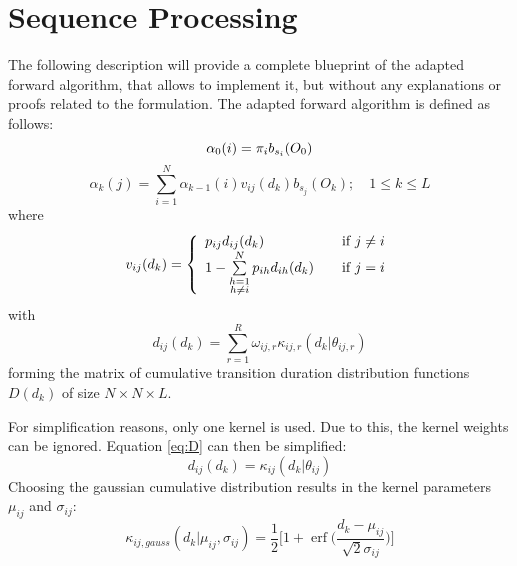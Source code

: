 \documentclass[mscthesis]{usiinfthesis}
\DeclareMathOperator{\erf}{erf}
\begin{document}
\section{Sequence Processing}

The following description will provide a complete blueprint of the adapted
forward algorithm, that allows to implement it, but without any explanations or
proofs related to the formulation. The adapted forward algorithm is defined as
follows:
\begin{equation}
    \label{eq:forward_init}
    \alpha_0(i) = \pi_{i}b_{s_i}(O_0) \\
\end{equation}
\begin{equation}
    \label{eq:forward}
    \alpha_k(j) = \sum_{i=1}^{N} \alpha_{k-1}(i) v_{ij}(d_k) b_{s_j}(O_k);
    \quad 1 \leq k \leq L
\end{equation}
where
\begin{equation}
    \label{eq:V}
    v_{ij}(d_k) = \left\{
        \begin{array}{l l}
            p_{ij} d_{ij}(d_k)
                & \quad \text{if $j \neq i$}\\
            1 - \sum\limits_{\substack{h=1 \\ h \neq i}}^{N} p_{ih} d_{ih}(d_k)
                & \quad \text{if $j = i$}
        \end{array} \right.
\end{equation}
with
\begin{equation}
    \label{eq:D}
    d_{ij}(d_k) = \sum_{r=1}^{R} \omega_{ij,r}\kappa_{ij,r}(d_k|\theta_{ij, r})
\end{equation}
forming the matrix of cumulative transition duration distribution functions
$ D(d_k) $ of size $ N \times N \times L $.

For simplification reasons, only one kernel is used. Due to this, the kernel
weights can be ignored. Equation \ref{eq:D} can then be simplified:
\begin{equation}
    \label{eq:D_fact}
    d_{ij}(d_k) = \kappa_{ij}(d_k | \theta_{ij})
\end{equation}
Choosing the gaussian cumulative distribution results in the kernel parameters
$ \mu_{ij} $ and $ \sigma_{ij} $:
\begin{equation}
    \label{eq:kernel}
    \kappa_{ij, gauss}(d_k | \mu_{ij}, \sigma_{ij}) = 
    \frac{1}{2}\bigg [1 + \erf \big (\frac{d_k - \mu_{ij}}{\sqrt 2 \sigma_{ij}}\big )
        \bigg ]
\end{equation}
\end{document}
